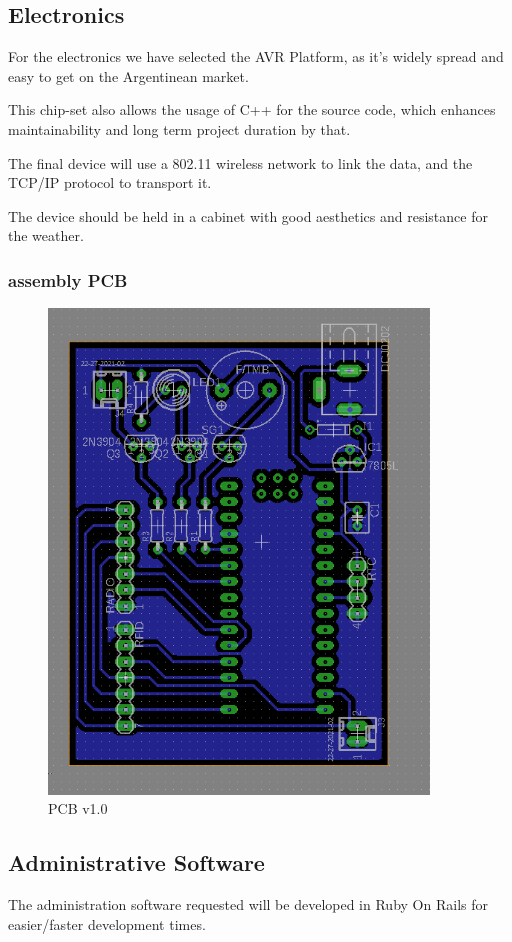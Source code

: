 \subsection{Electronics}
For the electronics we have selected the AVR Platform, as it's widely spread and easy to get on the Argentinean market.

This chip-set also allows the usage of C++ for the source code, which enhances maintainability and long term project duration by that.

The final device will use a 802.11 wireless network to link the data, and the TCP/IP protocol to transport it.

The device should be held in a cabinet with good aesthetics and resistance for the weather.  

\subsubsection{assembly PCB}
\begin{figure}
	\caption{PCB v1.0}
	\includegraphics[width=0.9\textwidth]{images/weightlogger_pcb}
\end{figure}

\subsection{Administrative Software}

The administration software requested will be developed in Ruby On Rails for easier/faster development times.
